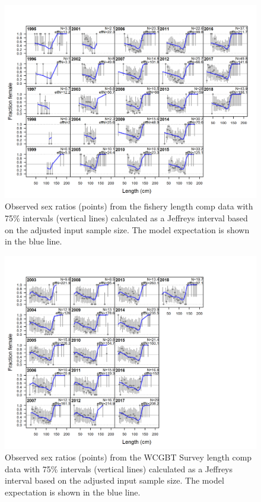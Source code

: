 \documentclass[12pt,]{article}
\begin{document}
\begin{figure}
\centering
\includegraphics{r4ss/plots_mod1/sexratio_len_flt1mkt2.png}
\caption{Observed sex ratios (points) from the fishery length comp data
with 75\% intervals (vertical lines) calculated as a Jeffreys interval
based on the adjusted input sample size. The model expectation is shown
in the blue line.\label{fig:sexratio_len_flt1mkt2}}
\end{figure}

\begin{figure}
\centering
\includegraphics{r4ss/plots_mod1/sexratio_len_flt5mkt0.png}
\caption{Observed sex ratios (points) from the WCGBT Survey length comp
data with 75\% intervals (vertical lines) calculated as a Jeffreys
interval based on the adjusted input sample size. The model expectation
is shown in the blue line.\label{fig:sexratio_len_flt5mkt0}}
\end{figure}
\end{document}
